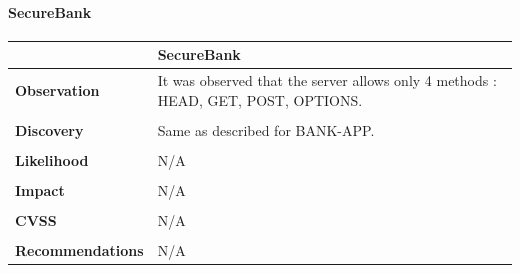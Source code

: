 \paragraph{SecureBank} \mbox{}
\begin{longtable*}{p{.30\textwidth} | p{.70\textwidth}}
    \hline
    & \textbf{SecureBank} \\
    \hline
    \textbf{Observation} &
      It was observed that the server allows only 4 methods : HEAD, GET, POST, OPTIONS.
    \\\\
    \textbf{Discovery} &
      Same as described for BANK-APP.
    \\\\
    \textbf{Likelihood} &
        N/A
    \\\\
    \textbf{Impact} &
        N/A
    \\\\
    \textbf{CVSS} &
        N/A
    \\\\
    \textbf{Recommendations} &
     N/A\\
     \hline	
\end{longtable*}
\clearpage